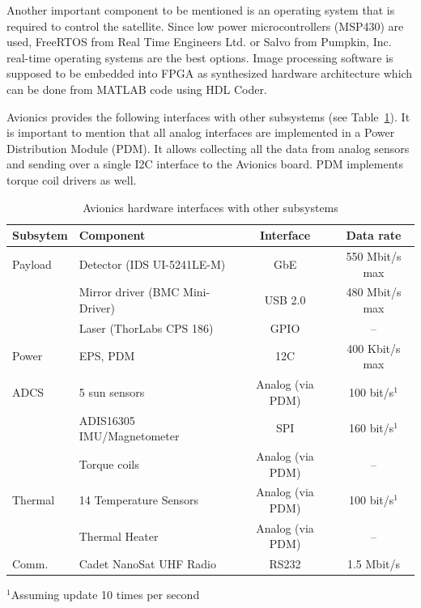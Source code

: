 \documentclass[12pt]{article}
\begin{document}
Another important component to be mentioned is an operating system that is required to control the satellite. Since low power microcontrollers (MSP430) are used, FreeRTOS from Real Time Engineers Ltd. \cite{avionics_RTOS} or Salvo from Pumpkin, Inc. \cite{avionics_pumpkin} real-time operating systems are the best options. Image processing software is supposed to be embedded into FPGA as synthesized hardware architecture which can be done from MATLAB code using HDL Coder.

Avionics provides the following interfaces with other subsystems (see Table~\ref{table:avionics_interfaces}). It is important to mention that all analog interfaces are implemented in a Power Distribution Module (PDM). It allows collecting all the data from analog sensors and sending over a single I2C interface to the Avionics board. PDM implements torque coil drivers as well.


\begin{table}[ht]
\caption{Avionics hardware interfaces with other subsystems}
\label{table:avionics_interfaces}
\begin{center}
    \begin{tabular}{| p{2cm} | l | c | c |} \hline
    	\textbf{Subsytem} & \textbf{Component} & \textbf{Interface} & \textbf{Data rate} \\ \hline \hline
    Payload & Detector (IDS UI-5241LE-M) & GbE & 550 Mbit/s max  \\
     & Mirror driver (BMC Mini-Driver) & USB 2.0 & 480 Mbit/s max \\
     & Laser (ThorLabs CPS 186) & GPIO & -- \\ \hline
    Power & EPS, PDM & 12C & 400 Kbit/s max \\ \hline
    ADCS & 5 sun sensors & Analog (via PDM) & 100 bit/s$^1$ \\
     & ADIS16305 IMU/Magnetometer & SPI & 160 bit/s$^1$ \\
     & Torque coils & Analog (via PDM) & -- \\ \hline
    Thermal & 14 Temperature Sensors & Analog (via PDM) & 100 bit/s$^1$ \\
     & Thermal Heater & Analog (via PDM) & -- \\ \hline
    Comm. & Cadet NanoSat UHF Radio & RS232 & 1.5 Mbit/s \\ \hline 
    \end{tabular}
$^1$Assuming update 10 times per second
\end{center}
\end{table}
\end{document}
